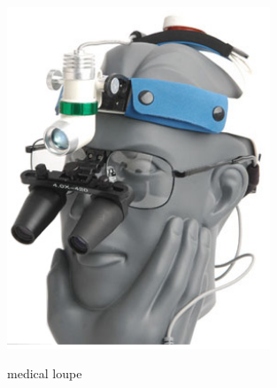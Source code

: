 \documentclass[a4paper,10pt]{report}
\begin{document}
\begin{figure}[ht]
  \centering
	\includegraphics[width=0.7\textwidth, keepaspectratio=true]{medical-loupe-1}
  \caption{medical loupe}\cite{njnorth}
  \label{fig:medical-loupe}
\end{figure}


\clearpage
%
{}

%




\end{document}
